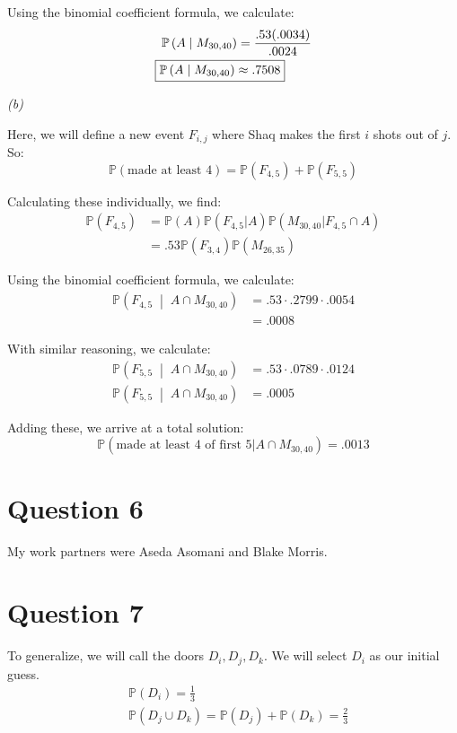 \documentclass[titlepage, 12pt, leqno]{article}
\begin{document}
Using the binomial coefficient formula, we calculate:
\begin{align*}
    \mathbb{P}\left(A \;\middle|\; M_{30,40}\right) &= \frac{.53(.0034)}{.0024} \\
    \Aboxed{\mathbb{P}\left(A \;\middle|\; M_{30,40}\right) &\approx .7508} 
\end{align*}

\textit{(b)} 

Here, we will define a new event $F_{i,j}$ where Shaq makes the first $i$ shots out of $j$. So:
\[
    \mathbb{P}(\text{made at least 4}) = \mathbb{P}(F_{4,5}) + \mathbb{P}(F_{5,5})
\]

Calculating these individually, we find:
\begin{align*}
    \mathbb{P}(F_{4,5}) &= \mathbb{P}(A)\mathbb{P}(F_{4,5} | A)\mathbb{P}(M_{30,40} | F_{4,5} \cap A) \\
                        &= .53\mathbb{P}(F_{3,4})\mathbb{P}(M_{26,35})
\end{align*}

Using the binomial coefficient formula, we calculate:
\begin{align*}
    \mathbb{P}\left(F_{4,5} \;\middle|\; A \cap M_{30,40}\right) &= .53 \cdot .2799 \cdot .0054 \\
                                                                 &= .0008
\end{align*}

With similar reasoning, we calculate:
\begin{align*}
    \mathbb{P}\left(F_{5,5} \;\middle|\; A \cap M_{30,40}\right) &= .53 \cdot .0789 \cdot .0124 \\
    \mathbb{P}\left(F_{5,5} \;\middle|\; A \cap M_{30,40}\right) &= .0005
\end{align*}

Adding these, we arrive at a total solution:
\[
    \boxed{\mathbb{P}(\text{made at least 4 of first 5} | A \cap M_{30,40}) = .0013} 
\]

\pagebreak 
\section{Question 6}
My work partners were Aseda Asomani and Blake Morris.

\pagebreak
\section{Question 7}
To generalize, we will call the doors $D_i, D_j, D_k$. We will select $D_i$ as our initial guess.
\begin{align*}
    &\mathbb{P}(D_i) = \frac{1}{3} \\
    &\mathbb{P}(D_j \cup D_k) = \mathbb{P}(D_j) + \mathbb{P}(D_k) = \frac{2}{3} 
\end{align*}
\end{document}
